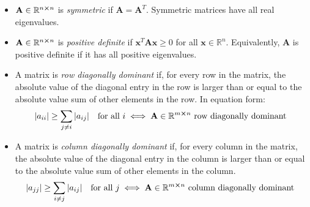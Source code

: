 \documentclass[11pt, a4paper]{article}
\newcommand{\R}{\mathbb{R}} %
\newcommand{\mat}[1]{\mathbf{#1}} %
\begin{document}
\begin{itemize}
\begin{itemize}
		\item $ \mat{A} \in \R^{n \cross n} $ is \textit{symmetric} if $ \mat{A} = \mat{A}^{T} $. Symmetric matrices have all real eigenvalues.
		
		\item  $ \mat{A} \in \R^{n \cross n} $ is \textit{positive definite} if $ \bm{x}^{T} \mat{A} \bm{x} \geq 0 $ for all $ \bm{x} \in \R^{n} $. Equivalently, $ \mat{A} $ is positive definite if it has all positive eigenvalues.
		
		\item A matrix is \textit{row diagonally dominant} if, for every row in the matrix, the absolute value of the diagonal entry in the row is larger than or equal to the absolute value sum of other elements in the row. In equation form:
		\begin{equation*}
			\abs{a_{ii}} \geq \sum_{j \neq i} \abs{a_{ij}} \quad \text{for all } i \iff 	\mat{A} \in \R^{m \cross n} \text{ row diagonally dominant } 
		\end{equation*}
				
		\item A matrix is \textit{column diagonally dominant} if, for every column in the matrix, the absolute value of the diagonal entry in the column is larger than or equal to the absolute value sum of other elements in the column. 
		\begin{equation*}
	 		\abs{a_{jj}} \geq \sum_{i \neq j} \abs{a_{ij}} \quad \text{for all } j \iff 	\mat{A} \in \R^{m\cross n} \text{ column diagonally dominant } 
		\end{equation*}

	\end{itemize}

	
	
\end{itemize}
\end{document}
